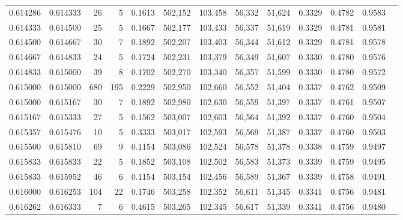 \begin{tabular}{rrrrrrrrrrrrr}
0.614286 & 0.614333 &    26 &   5 &                                     0.1613 & 502,152 & 103,458 &  56,332 &  51,624 & 0.3329 & 0.4782 & 0.9583 \\
0.614333 & 0.614500 &    25 &   5 &                                     0.1667 & 502,177 & 103,433 &  56,337 &  51,619 & 0.3329 & 0.4781 & 0.9581 \\
0.614500 & 0.614667 &    30 &   7 &                                     0.1892 & 502,207 & 103,403 &  56,344 &  51,612 & 0.3329 & 0.4781 & 0.9578 \\
0.614667 & 0.614833 &    24 &   5 &                                     0.1724 & 502,231 & 103,379 &  56,349 &  51,607 & 0.3330 & 0.4780 & 0.9576 \\
0.614833 & 0.615000 &    39 &   8 &                                     0.1702 & 502,270 & 103,340 &  56,357 &  51,599 & 0.3330 & 0.4780 & 0.9572 \\
0.615000 & 0.615000 &   680 & 195 &                                     0.2229 & 502,950 & 102,660 &  56,552 &  51,404 & 0.3337 & 0.4762 & 0.9509 \\
0.615000 & 0.615167 &    30 &   7 &                                     0.1892 & 502,980 & 102,630 &  56,559 &  51,397 & 0.3337 & 0.4761 & 0.9507 \\
0.615167 & 0.615333 &    27 &   5 &                                     0.1562 & 503,007 & 102,603 &  56,564 &  51,392 & 0.3337 & 0.4760 & 0.9504 \\
0.615357 & 0.615476 &    10 &   5 &                                     0.3333 & 503,017 & 102,593 &  56,569 &  51,387 & 0.3337 & 0.4760 & 0.9503 \\
0.615500 & 0.615810 &    69 &   9 &                                     0.1154 & 503,086 & 102,524 &  56,578 &  51,378 & 0.3338 & 0.4759 & 0.9497 \\
0.615833 & 0.615833 &    22 &   5 &                                     0.1852 & 503,108 & 102,502 &  56,583 &  51,373 & 0.3339 & 0.4759 & 0.9495 \\
0.615833 & 0.615952 &    46 &   6 &                                     0.1154 & 503,154 & 102,456 &  56,589 &  51,367 & 0.3339 & 0.4758 & 0.9491 \\
0.616000 & 0.616253 &   104 &  22 &                                     0.1746 & 503,258 & 102,352 &  56,611 &  51,345 & 0.3341 & 0.4756 & 0.9481 \\
0.616262 & 0.616333 &     7 &   6 &                                     0.4615 & 503,265 & 102,345 &  56,617 &  51,339 & 0.3341 & 0.4756 & 0.9480 \\

\end{tabular}

